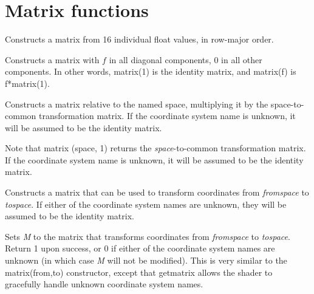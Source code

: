 \documentclass[11pt,letterpaper]{book}
\def\float{{\cf float}\xspace}
\def\matrix{{\cf matrix}\xspace}
\begin{document}
\section{Matrix functions}
\label{sec:stdlib:matrix}

Constructs a \matrix from 16 individual \float values, in row-major
order.  
\apiend

Constructs a \matrix with $f$ in all diagonal components, 0 in all other
components.  In other words, {\cf matrix(1)} is the identity matrix, and
{\cf matrix(f)} is {\cf f*matrix(1)}.
\apiend

Constructs a \matrix relative to the named space, multiplying it by the
{\cf space}-to-{\cf common} transformation matrix.  If the coordinate
system name is unknown, it will be assumed to be the identity matrix.

Note that {\cf matrix (space, 1)} returns the 
\emph{space}-to-{\cf common} transformation matrix. If the coordinate
system name is unknown, it will be assumed to be the identity matrix.
\apiend

Constructs a \matrix that can be used to transform coordinates from
\emph{fromspace} to \emph{tospace}.  If either of the coordinate
system names are unknown, they will be assumed to be the identity matrix.
\apiend


Sets \emph{M} to the \matrix that transforms coordinates from
\emph{fromspace} to \emph{tospace}.  Return 1 upon success, or 0 if
either of the coordinate system names are unknown (in which case
\emph{M} will not be modified).  This is very similar to the
{\cf matrix(from,to)} constructor, except that {\cf getmatrix} allows
the shader to gracefully handle unknown coordinate system names.
\apiend
\end{document}
